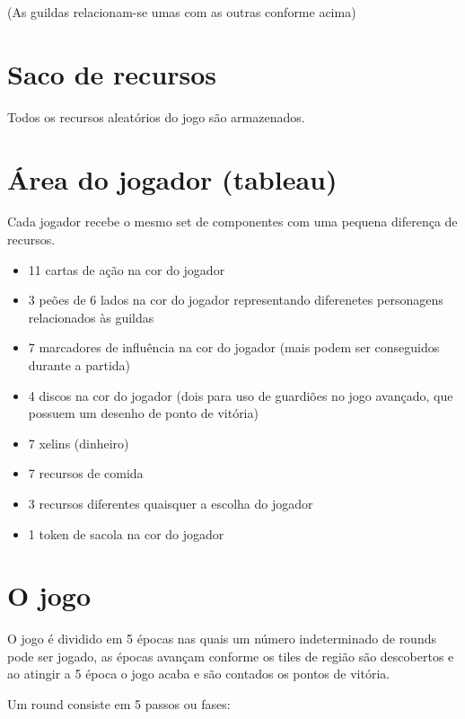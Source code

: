 \documentclass[11pt]{article}
\begin{document}
(As guildas relacionam-se umas com as outras conforme acima)

\section{Saco de recursos}
\label{sec:orgheadline3}

Todos os recursos aleatórios do jogo são armazenados.

\section{Área do jogador (tableau)}
\label{sec:orgheadline4}

Cada jogador recebe o mesmo set de componentes com uma pequena diferença de recursos.

\begin{itemize}
\item 11 cartas de ação na cor do jogador
\item 3 peões de 6 lados na cor do jogador representando diferenetes personagens relacionados às guildas
\item 7 marcadores de influência na cor do jogador (mais podem ser conseguidos durante a partida)
\item 4 discos na cor do jogador (dois para uso de guardiões no jogo avançado, que possuem um desenho de ponto de vitória)
\item 7 xelins (dinheiro)
\item 7 recursos de comida
\item 3 recursos diferentes quaisquer a escolha do jogador
\item 1 token de sacola na cor do jogador
\end{itemize}

\section{O jogo}
\label{sec:orgheadline5}

O jogo é dividido em 5 épocas nas quais um número indeterminado de rounds pode ser jogado, as épocas avançam conforme os tiles de região são descobertos e ao atingir a 5 época o jogo acaba e são contados os pontos de vitória.


Um round consiste em 5 passos ou fases:
\end{document}
